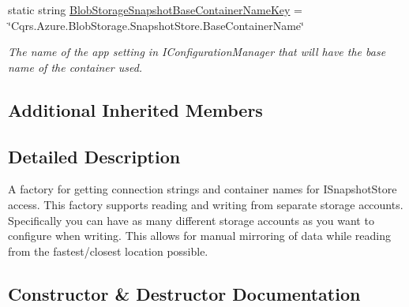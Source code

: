 \begin{DoxyCompactItemize}
static string \hyperlink{classCqrs_1_1Azure_1_1BlobStorage_1_1Events_1_1BlobStorageSnapshotStoreConnectionStringFactory_a9777a326f415cc28d4b14133da4347da_a9777a326f415cc28d4b14133da4347da}{Blob\+Storage\+Snapshot\+Base\+Container\+Name\+Key} = \char`\"{}Cqrs.\+Azure.\+Blob\+Storage.\+Snapshot\+Store.\+Base\+Container\+Name\char`\"{}
\begin{DoxyCompactList}\small\item\em The name of the app setting in I\+Configuration\+Manager that will have the base name of the container used. \end{DoxyCompactList}\end{DoxyCompactItemize}
\subsection*{Additional Inherited Members}


\subsection{Detailed Description}
A factory for getting connection strings and container names for I\+Snapshot\+Store access. This factory supports reading and writing from separate storage accounts. Specifically you can have as many different storage accounts as you want to configure when writing. This allows for manual mirroring of data while reading from the fastest/closest location possible. 



\subsection{Constructor \& Destructor Documentation}
\mbox{\label{classCqrs_1_1Azure_1_1BlobStorage_1_1Events_1_1BlobStorageSnapshotStoreConnectionStringFactory_a40f386283f31751113ff2e6db02d6d07_a40f386283f31751113ff2e6db02d6d07}} 
